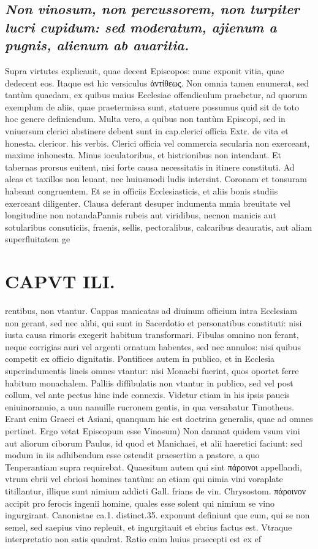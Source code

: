 \documentclass{article}
\begin{document}
\begin{pages}
\subsection*{\textit{ Non vinosum, non percussorem, non turpiter lucri cupidum: sed moderatum, ajienum a pugnis, alienum ab auaritia. }}\pstart Supra virtutes explicauit, quae decent Episcopos: nunc exponit vitia, quae dedecent eos. Itaque est hic versiculus ἀντίθεως. Non omnia tamen enumerat, sed tantùm quaedam, ex quibus maius Ecclesiae offendiculum praebetur, ad quorum exemplum de aliis, quae praetermissa sunt, statuere possumus quid sit de toto hoc genere definiendum. Multa vero, a quibus non tantùm Episcopi, sed in vniuersum clerici abstinere debent sunt in cap.clerici officia Extr. de vita et honesta. clericor. his verbis. Clerici officia vel commercia secularia non exerceant, maxime inhonesta. Minus ioculatoribus, et histrionibus non intendant. Et tabernas prorsus euitent, nisi forte causa necessitatis in itinere constituti. Ad aleas et taxillos non leuant, nec huiusmodi ludis intersint. Coronam et tonsuram habeant congruentem. Et se in officiis Ecclesiasticis, et aliis bonis studiis exerceant diligenter. Clausa deferant desuper indumenta mmia breuitate vel longitudine non notandaPannis rubeis aut viridibus, necnon manicis aut sotularibus consuticiis, fraenis, sellis, pectoralibus, calcaribus deauratis, aut aliam superfluitatem ge\pend
\section*{CAPVT  ILI. }
\marginpar{[ p.131 ]}\pstart rentibus, non vtantur. Cappas manicatas ad diuinum officium intra Ecclesiam non gerant, sed nec alibi, qui sunt in Sacerdotio et personatibus constituti: nisi iusta causa rimoris exegerit habitum transformari. Fibulas omnino non ferant, neque corrigias auri vel argenti ornatum habentes, sed nec annulos: nisi quibus competit ex officio dignitatis. Pontifices autem in publico, et in Ecclesia superindumentis lineis omnes vtantur: nisi Monachi fuerint, quos oportet ferre habitum monachalem. Palliis diffibulatis non vtantur in publico, sed vel post collum, vel ante pectus hinc inde connexis. Videtur etiam in his ipsis paucis eniuinoranuio, a uun nanuille rucronem gentis, in qua versabatur Timotheus. Erant enim Graeci et Asiani, quanquam hic est doctrina generalis, quae ad omnes pertinet. Ergo vetat Episcopum esse  \pend\pstart Vinosum) Non damnat quidem vsum vini aut aliorum ciborum Paulus, id quod et Manichaei, et alii haeretici faciunt: sed modum in iis adhibendum esse ostendit praesertim a pastore, a quo Tenperantiam supra requirebat. Quaesitum autem qui sint πάροινοι appellandi, vtrum ebrii vel ebriosi homines tantùm: an etiam qui nimia vini voraplate titillantur, illique sunt nimium addicti Gall. frians de vin. Chrysostom. πάροινον accipit pro ferocis ingenii homine, quales esse solent qui nimium se vino ingurgirant. Canonistae ca.1. distinct.35. exponunt definiunt que eum, qui se non semel, sed saepius vino repleuit, et ingurgitauit et ebrius factus est. Vtraque interpretatio non satis quadrat. Ratio enim huius praecepti est ex ef\pend

\end{pages}
\end{document}
